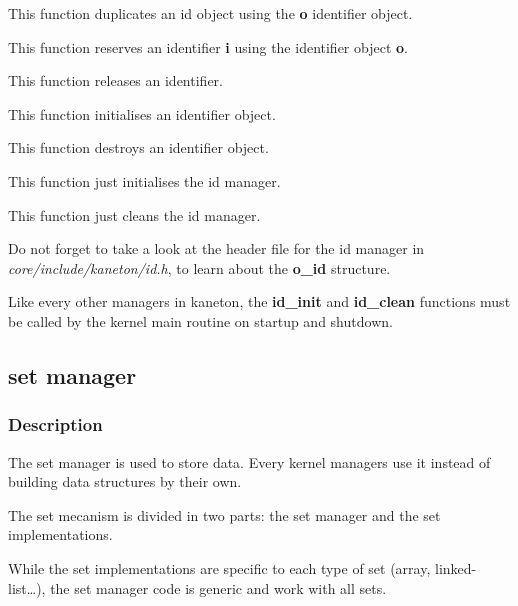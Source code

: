 This function duplicates an id object using the \textbf{o} identifier
object.


This function reserves an identifier \textbf{i} using the identifier
object \textbf{o}.


This function releases an identifier.


This function initialises an identifier object.


This function destroys an identifier object.


This function just initialises the id manager.


This function just cleans the id manager.

Do not forget to take a look  at the header file for the id manager in
\textit{core/include/kaneton/id.h}, to  learn about the \textbf{o\_id}
structure.

Like  every  other  managers  in kaneton,  the  \textbf{id\_init}  and
\textbf{id\_clean}  functions  must  be  called  by  the  kernel  main
routine on startup and shutdown.

%
%

\subsection{set manager}

\subsubsection{Description}

The set  manager is used to  store data. Every kernel  managers use it
instead of building data structures by their own.

The set mecanism is divided in  two parts: the set manager and the set
implementations.

While the set implementations are specific to each type of set (array,
linked-list\ldots), the set manager code  is generic and work with all
sets.

